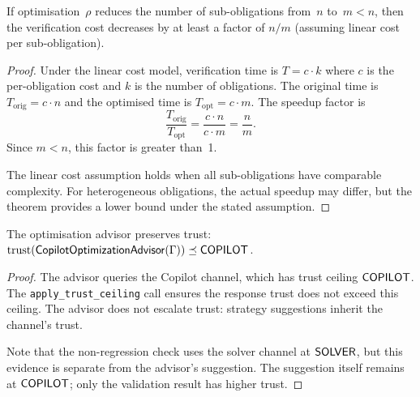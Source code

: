 \documentclass[11pt]{article}
\newcommand{\OptAdv}{\mathsf{CopilotOptimizationAdvisor}}
\begin{document}
\begin{theorem}\label{thm:searchred}
If optimisation~$\rho$ reduces the number of sub-obligations
from~$n$ to~$m < n$, then the verification cost decreases
by at least a factor of $n/m$ (assuming linear cost per
sub-obligation).
\end{theorem}
\begin{proof}
Under the linear cost model, verification time is
$T = c \cdot k$ where $c$ is the per-obligation cost and
$k$ is the number of obligations.  The original time is
$T_{\mathrm{orig}} = c \cdot n$ and the optimised time is
$T_{\mathrm{opt}} = c \cdot m$.  The speedup factor is
\[
  \frac{T_{\mathrm{orig}}}{T_{\mathrm{opt}}}
  = \frac{c \cdot n}{c \cdot m}
  = \frac{n}{m}.
\]
Since $m < n$, this factor is greater than~1.

The linear cost assumption holds when all sub-obligations
have comparable complexity.  For heterogeneous obligations,
the actual speedup may differ, but the theorem provides a
lower bound under the stated assumption.
\end{proof}

\begin{theorem}\label{thm:trustpres}
The optimisation advisor preserves trust:
$\mathrm{trust}(\OptAdv(\Gamma)) \tleq \Tcopilot$.
\end{theorem}
\begin{proof}
The advisor queries the Copilot channel, which has
trust ceiling $\mathsf{COPILOT}$.  The \texttt{apply\_trust\_ceiling}
call ensures the response trust does not exceed this
ceiling.  The advisor does not escalate trust:
strategy suggestions inherit the channel's trust.

Note that the non-regression check uses the solver channel
at $\mathsf{SOLVER}$, but this evidence is separate from the
advisor's suggestion.  The suggestion itself remains at
$\mathsf{COPILOT}$; only the validation result has higher trust.
\end{proof}
\end{document}
